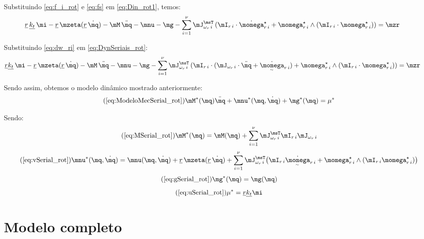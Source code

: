 \documentclass[]{politex}
\begin{document}
Substituindo \eqref{eq:f_i_rot} e \eqref{eq:fs} em  \eqref{eq:Din_rot1}, temos:
\begin{equation} \label{eq:DynSeriais_rot}
\underline{r} \, \underline{k_t} \, \mi - \underline{r} \, \mzeta(\underline{r} \, \dot{\mq}) - \mM \, \ddot{\mq} - \mnu - \mg  - \sum_{i=1}^\nu \mJ_{\omega_r \,i}^\msT \, ( \mI_{r\,i} \cdot \dot{\momega}_{r\,i}^\star + \momega_{r\,i}^\star \wedge (\mI_{r\,i} \cdot \momega_{r\,i}^\star)  )  = \mzr
\end{equation}

Substituindo \eqref{eq:dw_ri} em \eqref{eq:DynSeriais_rot}:
\begin{equation} \label{eq:DynSeriais_rot2}
\underline{r} \underline{k_t} \, \mi - \underline{r} \, \mzeta(\underline{r} \, \dot{\mq})  - \mM \, \ddot{\mq} - \mnu - \mg  - \sum_{i=1}^\nu \mJ_{\omega_r \,i}^\msT \, ( \mI_{r\,i} \cdot (\mJ_{\omega_r \,i}  \cdot \ddot{\mq} + \underaccent{\sim}{\dot{\momega}}_{r\,i}  ) + \momega_{r\,i}^\star \wedge (\mI_{r\,i} \cdot \momega_{r\,i}^\star)  )  = \mzr
\end{equation}

Sendo assim, obtemos o modelo dinâmico mostrado anteriormente:
\begin{equation} \tag{\ref{eq:ModeloMecSerial_rot}}
\mM^*(\mq) \ddot{\mq} + \mnu^*(\mq,\dot{\mq}) + \mg^*(\mq) = \mu^*
\end{equation}

Sendo:
\begin{equation} \tag{\ref{eq:MSerial_rot}}
\mM^*(\mq) = \mM(\mq) + \sum_{i=1}^\nu \mJ_{\omega_r \,i}^\msT \mI_{r\,i} \mJ_{\omega_r \,i}
\end{equation}
\begin{equation} \tag{\ref{eq:vSerial_rot}}
\mnu^*(\mq, \dot{\mq}) = \mnu(\mq, \dot{\mq}) + \underline{r} \, \mzeta(\underline{r} \, \dot{\mq}) + \sum_{i=1}^\nu
 \mJ_{\omega_r \,i}^\msT \big( \mI_{r\,i} \underaccent{\sim}{\dot{\momega}}_{r\,i} + \momega^\star_{r\,i} \wedge (\mI_{r\,i} \momega^\star_{r\,i}) \big)
\end{equation}
\begin{equation} \tag{\ref{eq:gSerial_rot}}
\mg^*(\mq) = \mg(\mq)
\end{equation}
\begin{equation} \tag{\ref{eq:uSerial_rot}}
\mu^* = \underline{r} \underline{k_t} \mi
\end{equation}

\section{Modelo completo}\label{S05-03-03}
\end{document}
